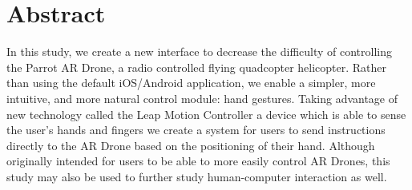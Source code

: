 \documentclass[letterpaper,english, 12pt]{article}
\begin{document}
\newpage

\section*{Abstract}
	In this study, we create a new interface to decrease the difficulty of controlling the Parrot AR Drone, a radio controlled flying quadcopter helicopter. Rather than using the default iOS/Android application, we enable a simpler, more intuitive, and more natural control module: hand gestures. Taking advantage of new technology called the Leap Motion Controller \textemdash a device which is able to sense the user's hands and fingers \textemdash we create a system for users to send instructions directly to the AR Drone based on the positioning of their hand. Although originally intended for users to be able to more easily control AR Drones, this study may also be used to further study human-computer interaction as well.
\end{document}
